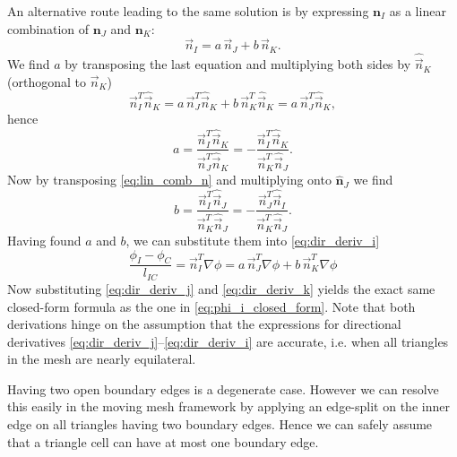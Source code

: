 \documentclass[preprint,nocopyrightspace]{sigplanconf}
\begin{document}
An alternative route leading to the same solution is by expressing
$\mathbf{n}_I$ as a linear combination of $\mathbf{n}_J$ and
$\mathbf{n}_K$:
\begin{equation}
\vec{n}_I = a \,\vec{n}_J + b\, \vec{n}_K.\label{eq:lin_comb_n}
\end{equation}
We find $a$ by transposing the last equation and multiplying both
sides by $\hat{\vec{n}}_K$ (orthogonal to $\vec{n}_K$)
\begin{equation}
\vec{n}_I^T \hat{\vec{n}}_K = a \,\vec{n}_J^T \hat{\vec{n}}_K + b\, \vec{n}_K^T \hat{\vec{n}}_K = a \,\vec{n}_J^T \hat{\vec{n}}_K,
\end{equation}
hence
\begin{equation}
a
 =
 \frac{\vec{n}_I^T \hat{\vec{n}}_K}{\vec{n}_J^T
   \hat{\vec{n}}_K} 
=
 -\frac{\vec{n}_I^T \hat{\vec{n}}_K}{\vec{n}_K^T \hat{\vec{n}}_J}.
\end{equation}
Now by transposing \eqref{eq:lin_comb_n} and multiplying onto
$\hat{\mathbf{n}}_J$ we find
\begin{equation}
  b 
  =
  \frac{\vec{n}_I^T \hat{\vec{n}}_J}{\vec{n}_K^T \hat{\vec{n}}_J}
  =
  -\frac{\vec{n}_J^T \hat{\vec{n}}_I}{\vec{n}_K^T \hat{\vec{n}}_J}
  .
\end{equation}
Having found $a$ and $b$, we can substitute them into
\eqref{eq:dir_deriv_i}
\begin{equation}
\frac{\phi_I - \phi_C}{l_{IC}} = \vec{n}_I^T \nabla \phi = a \,\vec{n}_J^T \nabla \phi + b \,\vec{n}_K^T \nabla \phi
\end{equation}
Now substituting \eqref{eq:dir_deriv_j} and \eqref{eq:dir_deriv_k}
yields the exact same closed-form formula as the one in
\eqref{eq:phi_i_closed_form}. Note that both derivations hinge on the
assumption that the expressions for directional derivatives
\eqref{eq:dir_deriv_j}--\eqref{eq:dir_deriv_i} are accurate, i.e. when
all triangles in the mesh are nearly equilateral.

Having two open boundary edges is a degenerate case. However we can
resolve this easily in the moving mesh framework by applying an
edge-split on the inner edge on all triangles having two boundary
edges. Hence we can safely assume that a triangle cell can have at
most one boundary edge.
\end{document}
